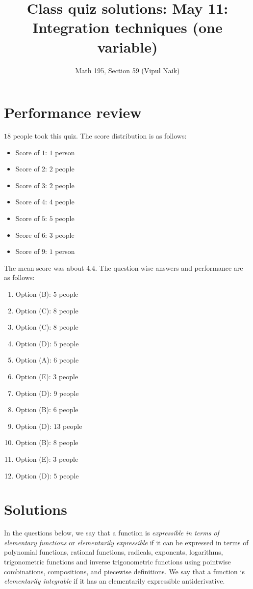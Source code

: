 \documentclass[10pt]{amsart}
\title{Class quiz solutions: May 11: Integration techniques (one variable)}
\author{Math 195, Section 59 (Vipul Naik)}
\begin{document}
\maketitle

\section{Performance review}

$18$ people took this quiz. The score distribution is as follows:

\begin{itemize}
\item Score of $1$: $1$ person
\item Score of $2$: $2$ people
\item Score of $3$: $2$ people
\item Score of $4$: $4$ people
\item Score of $5$: $5$ people
\item Score of $6$: $3$ people
\item Score of $9$: $1$ person
\end{itemize}

The mean score was about $4.4$. The question wise answers and
performance are as follows:

\begin{enumerate}
\item Option (B): $5$ people
\item Option (C): $8$ people
\item Option (C): $8$ people
\item Option (D): $5$ people
\item Option (A): $6$ people
\item Option (E): $3$ people
\item Option (D): $9$ people
\item Option (B): $6$ people
\item Option (D): $13$ people
\item Option (B): $8$ people
\item Option (E): $3$ people
\item Option (D): $5$ people
\end{enumerate}

\section{Solutions}

In the questions below, we say that a function is {\em expressible in
terms of elementary functions} or {\em elementarily expressible} if it
can be expressed in terms of polynomial functions, rational functions,
radicals, exponents, logarithms, trigonometric functions and inverse
trigonometric functions using pointwise combinations, compositions,
and piecewise definitions. We say that a function is {\em elementarily
integrable} if it has an elementarily expressible antiderivative.
\end{document}
